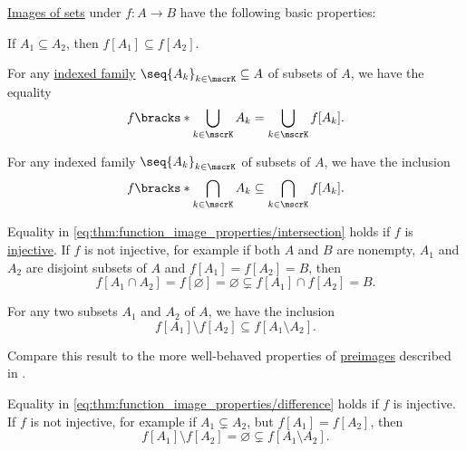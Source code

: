 \begin{proposition}\label{thm:function_image_properties}
  \hyperref[def:set_valued_map/image]{Images of sets} under \( f: A \to B \) have the following basic properties:
  \begin{thmenum}
     If \( A_1 \subseteq A_2 \), then \( f[A_1] \subseteq f[A_2] \).

     For any \hyperref[def:indexed_family]{indexed family} \( \seq{ A_k }_{k \in \mscrK} \subseteq A \) of subsets of \( A \), we have the equality
    \begin{equation}\label{eq:thm:function_image_properties/union}
      f\bracks*{ \bigcup_{k \in \mscrK} A_k } = \bigcup_{k \in \mscrK} f[A_k].
    \end{equation}

     For any indexed family \( \seq{ A_k }_{k \in \mscrK} \) of subsets of \( A \), we have the inclusion
    \begin{equation}\label{eq:thm:function_image_properties/intersection}
      f\bracks*{ \bigcap_{k \in \mscrK} A_k } \subseteq \bigcap_{k \in \mscrK} f[A_k].
    \end{equation}

    Equality in \eqref{eq:thm:function_image_properties/intersection} holds if \( f \) is \hyperref[def:function_invertibility/injective]{injective}. If \( f \) is not injective, for example if both \( A \) and \( B \) are nonempty, \( A_1 \) and \( A_2 \) are disjoint subsets of \( A \) and \( f[A_1] = f[A_2] = B \), then
    \begin{equation*}
      f[A_1 \cap A_2] = f[\varnothing] = \varnothing \subsetneq f[A_1] \cap f[A_2] = B.
    \end{equation*}

     For any two subsets \( A_1 \) and \( A_2 \) of \( A \), we have the inclusion
    \begin{equation}\label{eq:thm:function_image_properties/difference}
      f[A_1] \setminus f[A_2] \subseteq f[A_1 \setminus A_2].
    \end{equation}
  \end{thmenum}
\end{proposition}
\begin{comments}
  \item Compare this result to the more well-behaved properties of \hyperref[def:set_valued_map/inverse]{preimages} described in .

  \item Equality in \eqref{eq:thm:function_image_properties/difference} holds if \( f \) is injective. If \( f \) is not injective, for example if \( A_1 \subsetneq A_2 \), but \( f[A_1] = f[A_2] \), then
  \begin{equation*}
    f[A_1] \setminus f[A_2] = \varnothing \subsetneq f[A_1 \setminus A_2].
  \end{equation*}
\end{comments}
